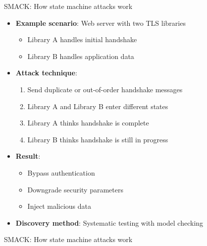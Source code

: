 \documentclass[aspectratio=169, lualatex, handout]{beamer}
\begin{document}
\begin{frame}{SMACK: How state machine attacks work}
	\begin{itemize}[<+->]
		\item \textbf{Example scenario}: Web server with two TLS libraries
		      \begin{itemize}
			      \item Library A handles initial handshake
			      \item Library B handles application data
		      \end{itemize}
		\item \textbf{Attack technique}:
		      \begin{enumerate}
			      \item Send duplicate or out-of-order handshake messages
			      \item Library A and Library B enter different states
			      \item Library A thinks handshake is complete
			      \item Library B thinks handshake is still in progress
		      \end{enumerate}
		\item \textbf{Result}:
		      \begin{itemize}
			      \item Bypass authentication
			      \item Downgrade security parameters
			      \item Inject malicious data
		      \end{itemize}
		\item \textbf{Discovery method}: Systematic testing with model checking
	\end{itemize}
\end{frame}

\begin{frame}{SMACK: How state machine attacks work}
\end{frame}
\end{document}
